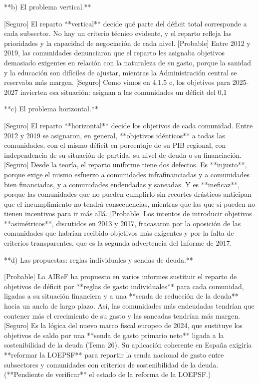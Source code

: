 \documentclass[10pt,a4paper]{article}
\begin{document}
**b) El problema vertical.**

[Seguro] El reparto **vertical** decide qué parte del déficit total corresponde a cada subsector. No hay un criterio técnico evidente, y el reparto refleja las prioridades y la capacidad de negociación de cada nivel. [Probable] Entre 2012 y 2019, las comunidades denunciaron que el reparto les asignaba objetivos demasiado exigentes en relación con la naturaleza de su gasto, porque la sanidad y la educación son difíciles de ajustar, mientras la Administración central se reservaba más margen. [Seguro] Como vimos en 4.1.5 c, los objetivos para 2025-2027 invierten esa situación: asignan a las comunidades un déficit del 0,1%

**c) El problema horizontal.**

[Seguro] El reparto **horizontal** decide los objetivos de cada comunidad. Entre 2012 y 2019 se asignaron, en general, **objetivos idénticos** a todas las comunidades, con el mismo déficit en porcentaje de su PIB regional, con independencia de su situación de partida, su nivel de deuda o su financiación. [Seguro] Desde la teoría, el reparto uniforme tiene dos defectos. Es **injusto**, porque exige el mismo esfuerzo a comunidades infrafinanciadas y a comunidades bien financiadas, y a comunidades endeudadas y saneadas. Y es **ineficaz**, porque las comunidades que no pueden cumplirlo sin recortes drásticos anticipan que el incumplimiento no tendrá consecuencias, mientras que las que sí pueden no tienen incentivos para ir más allá. [Probable] Los intentos de introducir objetivos **asimétricos**, discutidos en 2013 y 2017, fracasaron por la oposición de las comunidades que habrían recibido objetivos más exigentes y por la falta de criterios transparentes, que es la segunda advertencia del Informe de 2017.

**d) Las propuestas: reglas individuales y sendas de deuda.**

[Probable] La AIReF ha propuesto en varios informes sustituir el reparto de objetivos de déficit por **reglas de gasto individuales** para cada comunidad, ligadas a su situación financiera y a una **senda de reducción de la deuda** hacia un ancla de largo plazo. Así, las comunidades más endeudadas tendrían que contener más el crecimiento de su gasto y las saneadas tendrían más margen. [Seguro] Es la lógica del nuevo marco fiscal europeo de 2024, que sustituye los objetivos de saldo por una **senda de gasto primario neto** ligada a la sostenibilidad de la deuda (Tema 26). Su aplicación coherente en España exigiría **reformar la LOEPSF** para repartir la senda nacional de gasto entre subsectores y comunidades con criterios de sostenibilidad de la deuda. (**Pendiente de verificar** el estado de la reforma de la LOEPSF.)
\end{document}
